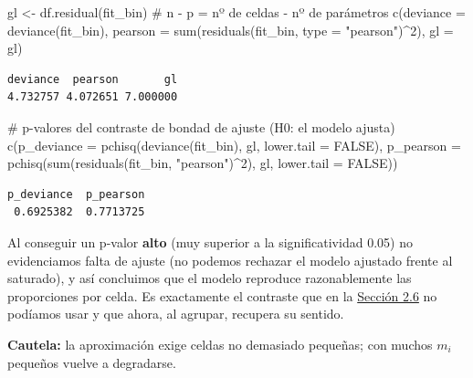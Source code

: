 \documentclass[
  letterpaper,
  DIV=11,
  numbers=noendperiod]{scrartcl}
\newenvironment{Shaded}{\begin{snugshade}}{\end{snugshade}}
\newcommand{\AttributeTok}[1]{\textcolor[rgb]{0.40,0.45,0.13}{#1}}
\newcommand{\CommentTok}[1]{\textcolor[rgb]{0.37,0.37,0.37}{#1}}
\newcommand{\ConstantTok}[1]{\textcolor[rgb]{0.56,0.35,0.01}{#1}}
\newcommand{\DecValTok}[1]{\textcolor[rgb]{0.68,0.00,0.00}{#1}}
\newcommand{\FunctionTok}[1]{\textcolor[rgb]{0.28,0.35,0.67}{#1}}
\newcommand{\NormalTok}[1]{\textcolor[rgb]{0.00,0.23,0.31}{#1}}
\newcommand{\OtherTok}[1]{\textcolor[rgb]{0.00,0.23,0.31}{#1}}
\newcommand{\SpecialCharTok}[1]{\textcolor[rgb]{0.37,0.37,0.37}{#1}}
\newcommand{\StringTok}[1]{\textcolor[rgb]{0.13,0.47,0.30}{#1}}
\begin{document}
\begin{Shaded}
\begin{Highlighting}[]
\NormalTok{gl }\OtherTok{\textless{}{-}} \FunctionTok{df.residual}\NormalTok{(fit\_bin)                       }\CommentTok{\# n {-} p = nº de celdas {-} nº de parámetros}
\FunctionTok{c}\NormalTok{(}\AttributeTok{deviance =} \FunctionTok{deviance}\NormalTok{(fit\_bin),}
  \AttributeTok{pearson  =} \FunctionTok{sum}\NormalTok{(}\FunctionTok{residuals}\NormalTok{(fit\_bin, }\AttributeTok{type =} \StringTok{"pearson"}\NormalTok{)}\SpecialCharTok{\^{}}\DecValTok{2}\NormalTok{),}
  \AttributeTok{gl       =}\NormalTok{ gl)}
\end{Highlighting}
\end{Shaded}

\begin{verbatim}
deviance  pearson       gl 
4.732757 4.072651 7.000000 
\end{verbatim}

\begin{Shaded}
\begin{Highlighting}[]
\CommentTok{\# p{-}valores del contraste de bondad de ajuste (H0: el modelo ajusta)}
\FunctionTok{c}\NormalTok{(}\AttributeTok{p\_deviance =} \FunctionTok{pchisq}\NormalTok{(}\FunctionTok{deviance}\NormalTok{(fit\_bin), gl, }\AttributeTok{lower.tail =} \ConstantTok{FALSE}\NormalTok{),}
  \AttributeTok{p\_pearson  =} \FunctionTok{pchisq}\NormalTok{(}\FunctionTok{sum}\NormalTok{(}\FunctionTok{residuals}\NormalTok{(fit\_bin, }\StringTok{"pearson"}\NormalTok{)}\SpecialCharTok{\^{}}\DecValTok{2}\NormalTok{), gl, }\AttributeTok{lower.tail =} \ConstantTok{FALSE}\NormalTok{))}
\end{Highlighting}
\end{Shaded}

\begin{verbatim}
p_deviance  p_pearson 
 0.6925382  0.7713725 
\end{verbatim}

Al conseguir un p-valor \textbf{alto} (muy superior a la
significatividad 0.05) no evidenciamos falta de ajuste (no podemos
rechazar el modelo ajustado frente al saturado), y así concluimos que el
modelo reproduce razonablemente las proporciones por celda. Es
exactamente el contraste que en la
\protect\hyperlink{sec-u12-diagnostico}{Sección 2.6} no podíamos usar y
que ahora, al agrupar, recupera su sentido.

\begin{tcolorbox}[enhanced jigsaw, breakable, colframe=quarto-callout-important-color-frame, left=2mm, arc=.35mm, colbacktitle=quarto-callout-important-color!10!white, toprule=.15mm, colback=white, coltitle=black, rightrule=.15mm, opacitybacktitle=0.6, title=\textcolor{quarto-callout-important-color}{\faExclamation}\hspace{0.5em}{Importante}, titlerule=0mm, toptitle=1mm, bottomtitle=1mm, leftrule=.75mm, bottomrule=.15mm, opacityback=0]

\textbf{Cautela:} la aproximación exige celdas no demasiado pequeñas;
con muchos \(m_i\) pequeños vuelve a degradarse.

\end{tcolorbox}
\end{document}
